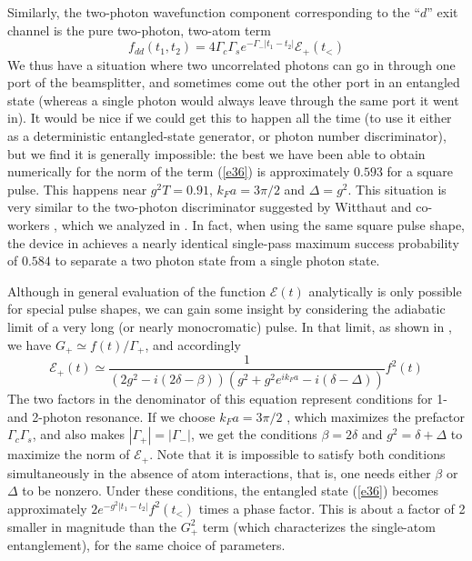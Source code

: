 \documentclass[aps,pra,twocolumn,floatfix,superscriptaddress]{revtex4}
\begin{document}
Similarly, the two-photon wavefunction component corresponding to the ``$d$'' exit channel is the pure two-photon, two-atom term
\begin{equation}
f_{dd}(t_1,t_2)= 4\Gamma_c\Gamma_s e^{-\Gamma_{-} |t_1-t_2|}  \mathcal{E}_+(t_<)
\label{e36}
\end{equation}
We thus have a situation where two uncorrelated photons can go in through one port of the beamsplitter, and sometimes come out the other port in an entangled state (whereas a single photon would always leave through the same port it went in).  It would be nice if we could get this to happen all the time (to use it either as a deterministic entangled-state generator, or photon number discriminator), but we find it is generally impossible: the best we have been able to obtain numerically for the norm of the term (\ref{e36}) is approximately  $0.593$ for a square pulse. This happens near $g^2 T = 0.91$, $k_F a=3\pi/2$ and $\Delta=g^2$.
This situation is very similar to the two-photon discriminator suggested by Witthaut and co-workers \cite{witthaut}, which we analyzed in \cite{us}. In fact, when using the same square pulse shape, the device in \cite{witthaut} achieves a nearly identical single-pass maximum success probability of $0.584$ to separate a two photon state from a single photon state.  

Although in general evaluation of the function $\mathcal{E}(t)$ analytically is only possible for special pulse shapes, we can gain some insight by considering the adiabatic limit of a very long (or nearly monocromatic) pulse.  In that limit, as shown in \cite{us}, we have $G_+ \simeq f(t)/\Gamma_+$, and accordingly
\begin{equation}
\mathcal{E}_+(t) \simeq \frac{1}{(2g^2-i( 2\delta-\beta ))(g^2+g^2 e^{ik_F a}-i(\delta-\Delta))} f^2(t) 
\label{e37}
\end{equation}
The two factors in the denominator of this equation represent conditions for 1- and 2-photon resonance.  If we choose  $k_F a= 3\pi/2$ , which maximizes the prefactor $\Gamma_c\Gamma_s$, and also makes $|\Gamma_+|=|\Gamma_-|$, we get the conditions $ \beta=2\delta $ and $g^2=\delta+\Delta$ to maximize the norm of $\mathcal{E}_+$.  Note that it is impossible to satisfy both conditions simultaneously in the absence of atom interactions, that is, one needs either $\beta$ or $\Delta$ to be nonzero.  Under these conditions, the entangled state (\ref{e36}) becomes approximately $2e^{-g^2|t_1-t_2|}f^2(t_<)$ times a phase factor.  This is about a factor of 2 smaller in magnitude than the $G_+^2$ term (which characterizes the single-atom entanglement), for the same choice of parameters.
\end{document}
